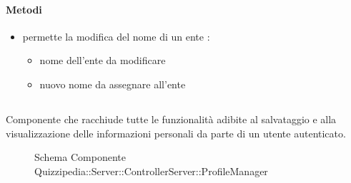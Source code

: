 \paragraph{Metodi}
\begin{itemize}
\item {}
\newline
permette la modifica del nome di un ente
\newline
{} :
\begin{itemize}
\item {}
\newline
nome dell'ente da modificare
\item {}
\newline
nuovo nome da assegnare all'ente
\end{itemize}
\end{itemize}
\subsection{}
Componente che racchiude tutte le funzionalità adibite al salvataggio e alla visualizzazione delle informazioni personali da parte di un utente autenticato.
\begin{figure}[H]
\centering
\noindent{}
\caption[Schema Componente Quizzipedia::Server::ControllerServer::ProfileManager]{Schema Componente Quizzipedia::Server::ControllerServer::ProfileManager}
\end{figure}
